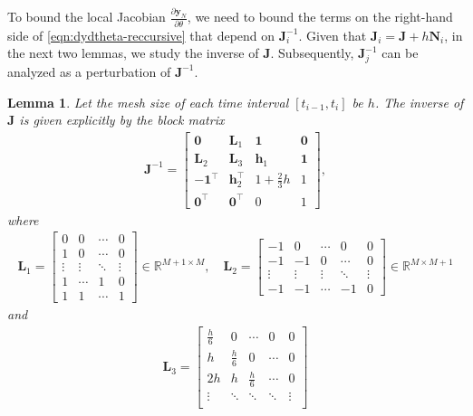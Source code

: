 \documentclass[12pt]{article}
\newtheorem{lemma}[theorem]{Lemma}
\begin{document}
To bound the local Jacobian $\frac{\partial \bm{y}_{N}}{\partial \theta} $, we need to bound the terms on the right-hand side of \eqref{eqn:dydtheta-reccursive} that depend on $\mathbf{J}_i^{-1}$.  Given that $\mathbf{J}_i = \mathbf{J} + h \mathbf{N}_i$, in the next two lemmas, we study the inverse of $\mathbf{J}$. Subsequently, $\mathbf{J}_j^{-1}$ can be analyzed as a perturbation of $\mathbf{J}^{-1}$.
\begin{lemma}\label{lem:invJ}
Let the mesh size of each time interval $[t_{i-1}, t_i]$ be $h$. The inverse of $\mathbf{J}$ is given explicitly by the block matrix
\begin{align*}
		\mathbf{J}^{-1} = 
\begin{bmatrix}
	\mathbf{0} & \mathbf{L}_1 & \mathbf{1} & \mathbf{0} \\
	\mathbf{L}_2 & \mathbf{L}_3 & \mathbf{h}_1 & \mathbf{1} \\
	-\mathbf{1}^\intercal & \mathbf{h}_2^\intercal & 1 + \frac{2}{3}h & 1 \\
	\mathbf{0}^{\intercal} & \mathbf{0}^{\intercal} & 0  & 1
\end{bmatrix},	
\end{align*}
where 
\begin{align*}
	\mathbf{L}_1 = 
	\begin{bmatrix}
	0 & 0 & \cdots & 0 \\
	1 & 0 & \cdots & 0 \\
	\vdots & \vdots & \ddots & \vdots \\
	1 & \cdots & 1& 0 \\
	1 & 1 & \cdots & 1
	\end{bmatrix} \in \mathbb{R}^{M+1\times M}, \quad 
	\mathbf{L}_2 = 
	\begin{bmatrix}
		-1 & 0 & \cdots & 0 & 0 \\
		-1 & -1 & 0 & \cdots & 0 \\
		\vdots  & \vdots & \vdots & \ddots & \vdots \\
		-1 & -1 & \cdots & -1 & 0
	\end{bmatrix} \in \mathbb{R}^{M \times M+1}
\end{align*}
and 
\begin{align*}
	\mathbf{L}_3 = 
	\begin{bmatrix}
		\frac{h}{6} & 0 & \cdots & 0 & 0 \\
		h & \frac{h}{6} & 0  & \cdots & 0\\
		2h & h &  \frac{h}{6} & \cdots & 0 \\
		\vdots & \ddots  & \ddots & \ddots & \vdots \\

\end{bmatrix}
\end{align*}
\end{lemma}
\end{document}
